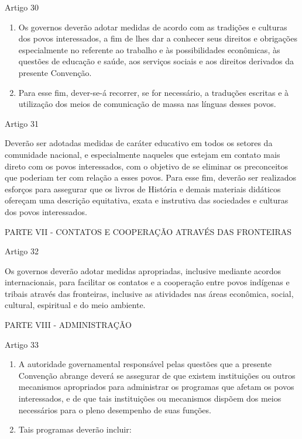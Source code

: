 \documentclass[
]{book}
\begin{document}
Artigo 30

\begin{enumerate}
\def\labelenumi{\arabic{enumi}.}
\item
  Os governos deverão adotar medidas de acordo com as tradições e culturas dos povos interessados, a fim de lhes dar a conhecer seus direitos e obrigações especialmente no referente ao trabalho e às possibilidades econômicas, às questões de educação e saúde, aos serviços sociais e aos direitos derivados da presente Convenção.
\item
  Para esse fim, dever-se-á recorrer, se for necessário, a traduções escritas e à utilização dos meios de comunicação de massa nas línguas desses povos.
\end{enumerate}

Artigo 31

Deverão ser adotadas medidas de caráter educativo em todos os setores da comunidade nacional, e especialmente naqueles que estejam em contato mais direto com os povos interessados, com o objetivo de se eliminar os preconceitos que poderiam ter com relação a esses povos. Para esse fim, deverão ser realizados esforços para assegurar que os livros de História e demais materiais didáticos ofereçam uma descrição equitativa, exata e instrutiva das sociedades e culturas dos povos interessados.

PARTE VII - CONTATOS E COOPERAÇÃO ATRAVÉS DAS FRONTEIRAS

Artigo 32

Os governos deverão adotar medidas apropriadas, inclusive mediante acordos internacionais, para facilitar os contatos e a cooperação entre povos indígenas e tribais através das fronteiras, inclusive as atividades nas áreas econômica, social, cultural, espiritual e do meio ambiente.

PARTE VIII - ADMINISTRAÇÃO

Artigo 33

\begin{enumerate}
\def\labelenumi{\arabic{enumi}.}
\item
  A autoridade governamental responsável pelas questões que a presente Convenção abrange deverá se assegurar de que existem instituições ou outros mecanismos apropriados para administrar os programas que afetam os povos interessados, e de que tais instituições ou mecanismos dispõem dos meios necessários para o pleno desempenho de suas funções.
\item
  Tais programas deverão incluir:
\end{enumerate}
\end{document}
